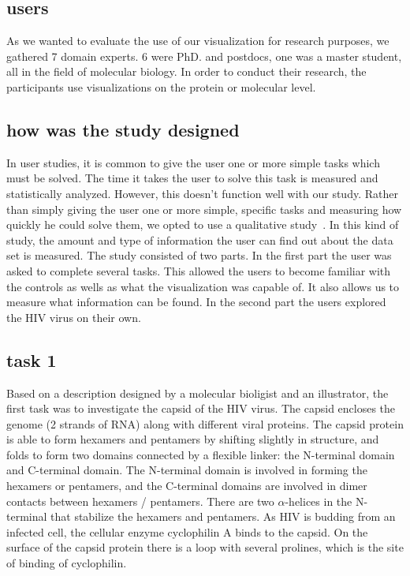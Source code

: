 \documentclass[review,journal]{vgtc}         %
\begin{document}
\subsection{users}
As we wanted to evaluate the use of our visualization for research purposes, we gathered 7 domain experts. 
6 were PhD. and postdocs, one was a master student, all in the field of molecular biology. 
In order to conduct their research, the participants use visualizations on the protein or molecular level.


\subsection{how was the study designed}
In user studies, it is common to give the user one or more simple tasks which must be solved. 
The time it takes the user to solve this task is measured and statistically analyzed. 
However, this doesn't function well with our study. 
Rather than simply giving the user one or more simple, specific tasks and measuring how quickly he could solve them, we opted to use a qualitative study~\cite{gomez2014insight}. 
In this kind of study, the amount and type of information the user can find out about the data set is measured. 
The study consisted of two parts. In the first part the user was asked to complete several tasks. 
This allowed the users to become familiar with the controls as wells as what the visualization was capable of. 
It also allows us to measure what information can be found.  In the second part the users explored the HIV virus on their own. 



\subsection{task 1}
Based on a description designed by a molecular bioligist and an illustrator, the first task was to investigate the capsid of the HIV virus.
The capsid encloses the genome (2 strands of RNA) along with different viral proteins. 
The capsid protein is able to form hexamers and pentamers by shifting slightly in structure, and folds to form two domains connected by a flexible linker: the N-terminal domain and C-terminal domain. 
The N-terminal domain is involved in forming the hexamers or pentamers, and the C-terminal domains are involved in dimer contacts between hexamers / pentamers. 
There are two $\alpha$-helices in the N-terminal that stabilize the hexamers and pentamers. 
As HIV is budding from an infected cell, the cellular enzyme cyclophilin A binds to the capsid. 
On the surface of the capsid protein there is a loop with several prolines, which is the site of binding of cyclophilin. 
\end{document}

